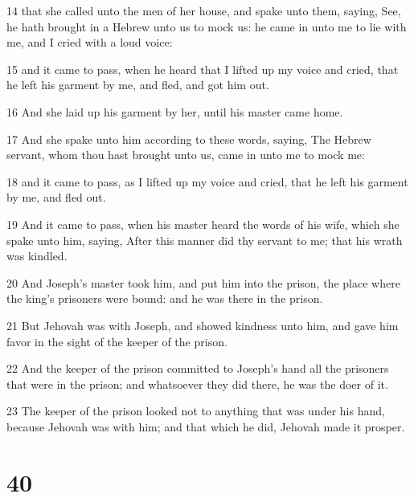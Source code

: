 \par 14 that she called unto the men of her house, and spake unto them, saying, See, he hath brought in a Hebrew unto us to mock us: he came in unto me to lie with me, and I cried with a loud voice:
\par 15 and it came to pass, when he heard that I lifted up my voice and cried, that he left his garment by me, and fled, and got him out.
\par 16 And she laid up his garment by her, until his master came home.
\par 17 And she spake unto him according to these words, saying, The Hebrew servant, whom thou hast brought unto us, came in unto me to mock me:
\par 18 and it came to pass, as I lifted up my voice and cried, that he left his garment by me, and fled out.
\par 19 And it came to pass, when his master heard the words of his wife, which she spake unto him, saying, After this manner did thy servant to me; that his wrath was kindled.
\par 20 And Joseph's master took him, and put him into the prison, the place where the king's prisoners were bound: and he was there in the prison.
\par 21 But Jehovah was with Joseph, and showed kindness unto him, and gave him favor in the sight of the keeper of the prison.
\par 22 And the keeper of the prison committed to Joseph's hand all the prisoners that were in the prison; and whatsoever they did there, he was the doer of it.
\par 23 The keeper of the prison looked not to anything that was under his hand, because Jehovah was with him; and that which he did, Jehovah made it prosper.

\chapter{40}

